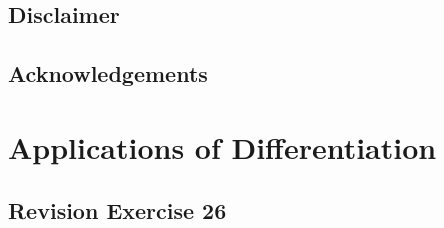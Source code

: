 \documentclass{report}
\begin{document}
\section*{Disclaimer}

\section*{Acknowledgements}

\singlespacing{}

\doublespacing{}
\tableofcontents
\singlespacing{}
\newpage

\onehalfspacing

\titlespacing*{\chapter}{0pt}{40pt}{40pt}

\chapter{Applications of Differentiation}

\newpage
\section{Revision Exercise 26}
\end{document}
